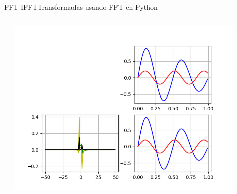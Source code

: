\begin{frame}{FFT-IFFT}{Transformadas usando FFT en Python}
   \handsonicon
   \begin{columns}[c]
      \hspace{2pt}
      \begin{column}{.55\textwidth}
         
      \end{column}
      \hspace{2pt}
      \vrule
      \hspace{2pt}
      \begin{column}{.45\textwidth}
         \centering\includegraphics[width=0.9\textwidth]{4_clase/fft1}
      \end{column}
   \end{columns}
   \vfill
\end{frame}
